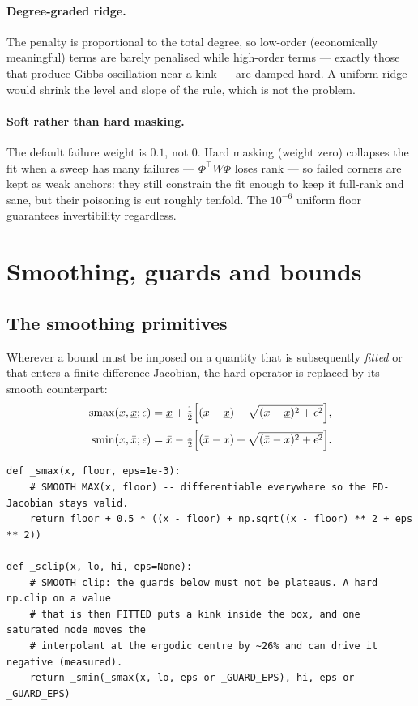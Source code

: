 \documentclass[11pt]{article}
\numberwithin{equation}{section}
\newcommand{\code}[1]{\texttt{\small #1}}
\theoremstyle{definition}
\theoremstyle{plain}
\theoremstyle{remark}
\begin{document}
\paragraph{Degree-graded ridge.} The penalty is proportional to the total degree, so
low-order (economically meaningful) terms are barely penalised while high-order terms
--- exactly those that produce Gibbs oscillation near a kink --- are damped hard. A
uniform ridge would shrink the level and slope of the rule, which is not the problem.

\paragraph{Soft rather than hard masking.} The default failure weight is $0.1$, not
$0$. Hard masking (weight zero) collapses the fit when a sweep has many failures ---
$\Phi^{\top}W\Phi$ loses rank --- so failed corners are kept as weak anchors: they
still constrain the fit enough to keep it full-rank and sane, but their poisoning is
cut roughly tenfold. The $10^{-6}$ uniform floor guarantees invertibility regardless.

\section{Smoothing, guards and bounds}
\label{sec:smoothing}

\subsection{The smoothing primitives}

Wherever a bound must be imposed on a quantity that is subsequently \emph{fitted} or
that enters a finite-difference Jacobian, the hard operator is replaced by its smooth
counterpart:
\begin{align}
\mathrm{smax}(x,\underline{x};\epsilon)
&=\underline{x}+\tfrac12\Bigl[(x-\underline{x})
   +\sqrt{(x-\underline{x})^{2}+\epsilon^{2}}\Bigr],
\label{eq:smax}\\[2pt]
\mathrm{smin}(x,\bar x;\epsilon)
&=\bar x-\tfrac12\Bigl[(\bar x-x)
   +\sqrt{(\bar x-x)^{2}+\epsilon^{2}}\Bigr].
\label{eq:smin}
\end{align}

\begin{lstlisting}[caption={Smoothing primitives. \code{point\_map.py}.}]
def _smax(x, floor, eps=1e-3):
    # SMOOTH MAX(x, floor) -- differentiable everywhere so the FD-Jacobian stays valid.
    return floor + 0.5 * ((x - floor) + np.sqrt((x - floor) ** 2 + eps ** 2))

def _sclip(x, lo, hi, eps=None):
    # SMOOTH clip: the guards below must not be plateaus. A hard np.clip on a value
    # that is then FITTED puts a kink inside the box, and one saturated node moves the
    # interpolant at the ergodic centre by ~26% and can drive it negative (measured).
    return _smin(_smax(x, lo, eps or _GUARD_EPS), hi, eps or _GUARD_EPS)
\end{lstlisting}
\end{document}
